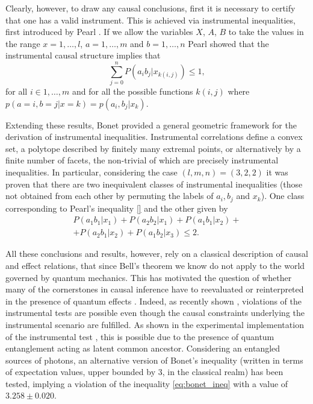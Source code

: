 \documentclass[letterpaper]{article}
\begin{document}
Clearly, however, to draw any causal conclusions, first it is necessary to certify that one has a valid instrument. This is achieved via instrumental inequalities, first introduced by Pearl \cite{}. If we allow the variables $X$, $A$, $B$ to take the values in the range  $x=1,\dots,l$, $a=1,\dots,m$ and $b=1,\dots,n$ Pearl showed that the instrumental causal structure implies that 
\begin{equation} 
    \sum_{j=0}^{n} P(a_i b_j|x_{k(i,j)}) \le 1,
    \label{eq:pearl_ineq}
\end{equation}
for all $i \in {1,\ldots, m}$ and for all the possible functions $k(i,j)$ where $p(a=i,b=j\vert x=k)=p(a_i,b_j|x_k)$.

Extending these results, Bonet \cite{bonet2001} provided a 
general geometric framework for the derivation of instrumental inequalities. Instrumental correlations define a convex set, a polytope described by finitely many extremal points, or alternatively by a finite number of facets, the non-trivial of which are precisely instrumental inequalities. In particular, considering the case $(l,m,n) = (3,2,2)$ it was proven that there are two inequivalent classes of instrumental inequalities (those not obtained from each other by permuting the labels of $a_i,b_j$ and $x_k$). One class corresponding to Pearl's inequality \eqref{} and the other given by
\begin{multline}
    P(a_1 b_1 | x_1) + P(a_2 b_2 | x_1) + 
    P(a_1 b_1 | x_2) +\\+ P(a_2 b_1 | x_2) + 
    P(a_1 b_2 | x_3) \le 2.
    \label{eq:bonet_ineq}
\end{multline}

All these conclusions and results, however, rely on a classical description of causal and effect relations, that since Bell's theorem \cite{} we know do not apply to the world governed by quantum mechanics. This has motivated the question of whether many of the cornerstones in causal inference have to reevaluated or reinterpreted in the presence of quantum effects \cite{}. Indeed, as recently shown \cite{chaves2018}, violations of the instrumental tests are possible even though the causal constraints underlying the instrumental scenario are fulfilled. As shown in the experimental implementation of the instrumental test \cite{}, this is possible due to the presence of quantum entanglement acting as latent common ancestor. Considering an entangled sources of photons, an alternative version of Bonet's inequality (written in terms of expectation values, upper bounded by 3, in the classical realm) has been tested, implying a violation of the inequality \eqref{eq:bonet_ineq} with a 
value of $3.258 \pm 0.020$. 
\end{document}
